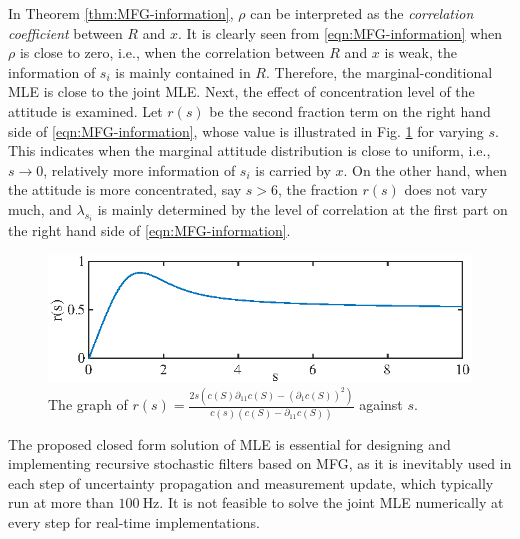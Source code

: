 In Theorem \ref{thm:MFG-information}, $\rho$ can be interpreted as the \textit{correlation coefficient} between $R$ and $x$.
It is clearly seen from \eqref{eqn:MFG-information} when $\rho$ is close to zero, i.e., when the correlation between $R$ and $x$ is weak, the information of $s_i$ is mainly contained in $R$.
Therefore, the marginal-conditional MLE is close to the joint MLE. 
Next, the effect of concentration level of the attitude is examined. 
Let $r(s)$ be the second fraction term on the right hand side of \eqref{eqn:MFG-information}, whose value is illustrated in Fig. \ref{fig:MFG-information} for varying $s$.
This indicates when the marginal attitude distribution is close to uniform, i.e., $s\rightarrow 0$, relatively more information of $s_i$ is carried by $x$.
On the other hand, when the attitude is more concentrated, say $s > 6$, the fraction $r(s)$ does not vary much, and $\lambda_{s_i}$ is mainly determined by the level of correlation at the first part on the right hand side of \eqref{eqn:MFG-information}.

\begin{figure}
	\centering
	\includegraphics[scale=1.4]{figures/MFG-information}
	\caption[The graph of $r(s)$ against $s$.]{The graph of $r(s) = \frac{2s\left(c(S)\partial_{11}c(S) - (\partial_1c(S))^2\right)}{c(s)\left(c(S)-\partial_{11}c(S)\right)}$ against $s$. \label{fig:MFG-information}}
\end{figure}

The proposed closed form solution of MLE is essential for designing and implementing recursive stochastic filters based on MFG, as it is inevitably used in each step of uncertainty propagation and measurement update, which typically run at more than $\SI{100}{\hertz}$.
It is not feasible to solve the joint MLE numerically at every step for real-time implementations.
